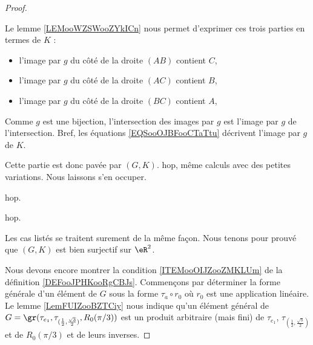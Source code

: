 \begin{proof}
\begin{subproof}
\begin{subproof}
\begin{subproof}
\begin{itemize}
				\end{itemize}
				Le lemme \ref{LEMooWZSWooZYkICn} nous permet d'exprimer ces trois parties en termes de \( K\) :
				\begin{itemize}
					\item l'image par \( g\) du côté de la droite \( (AB)\) contient \( C\),
					\item l'image par \( g\) du côté de la droite \( (AC)\) contient \( B\),
					\item l'image par \( g\) du côté de la droite \( (BC)\) contient \( A\),
				\end{itemize}
				Comme \( g\) est une bijection, l'intersection des images par \( g\) est l'image par \( g\) de l'intersection. Bref, les équations \eqref{EQSooOJBFooCTaTtu} décrivent l'image par \( g\) de \( K\).

				Cette partie est donc pavée par \( (G,K)\).
                    hop, même calculs avec des petites variations. Nous laissons  s'en occuper.
			\end{subproof}

			hop.
		\end{subproof}
		hop.
	\end{subproof}
	Les cas listés se traitent surement de la même façon. Nous tenons pour prouvé que \( (G,K)\) est bien surjectif sur \( \eR^2\).

	Nous devons encore montrer la condition \ref{ITEMooOIJZooZMKLUm} de la définition \ref{DEFooJPHKooRgCBJs}. Commençons par déterminer la forme générale d'un élément de \( G\) sous la forme \( \tau_a\circ r_0\) où \( r_0\) est une application linéaire. Le lemme \ref{LemFUIZooBZTCiy} nous indique qu'un élément général de \( G=\gr(\tau_{e_1}, \tau_{(\frac{ 1 }{2},\frac{ \sqrt{ 3 } }{2})}, R_0(\pi/3))\) est un produit arbitraire (mais fini) de \( \tau_{e_1}\), \( \tau_{(\frac{ 1 }{2},\frac{ \sqrt{ 3 } }{2})}\) et de \( R_0(\pi/3)\) et de leurs inverses.


\end{proof}
